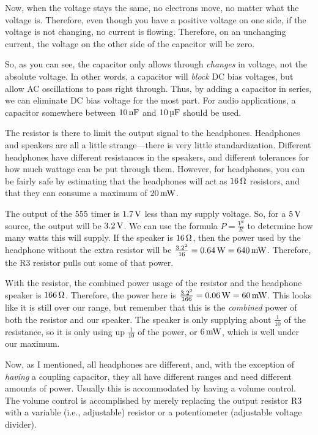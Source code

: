 Now, when the voltage stays the same, no electrons move, no matter what the voltage is.
Therefore, even though you have a positive voltage on one side, if the voltage is not changing, no current is flowing.
Therefore, on an unchanging current, the voltage on the other side of the capacitor will be zero.

So, as you can see, the capacitor only allows through \emph{changes} in voltage, not the absolute voltage.
In other words, a capacitor will \emph{block} DC bias voltages, but allow AC oscillations to pass right through.
Thus, by adding a capacitor in series, we can eliminate DC bias voltage for the most part.
For audio applications, a capacitor somewhere between $10\,\si{\nano\farad}$ and $10\,\si{\micro\farad}$ should be used.

The resistor is there to limit the output signal to the headphones.
Headphones and speakers are all a little strange---there is very little standardization.
Different headphones have different resistances in the speakers, and different tolerances for how much wattage can be put through them.
However, for headphones, you can be fairly safe by estimating that the headphones will act as $16\,\si{\ohm}$ resistors, and that they can consume a maximum of $20\,\si{\milli\watt}$.

The output of the 555 timer is $1.7\,\si{\volt}$ less than my supply voltage.
So, for a $5\,\si{\volt}$ source, the output will be $3.2\,\si{\volt}$. 
We can use the formula $P = \frac{V^2}{R}$ to determine how many watts this will supply.
If the speaker is $16\,\si{\ohm}$, then the power used by the headphone without the extra resistor will be $\frac{3.2^2}{16} = 0.64\,\si{\watt} = 640\,\si{\milli\watt}$.
Therefore, the R3 resistor pulls out some of that power.

With the resistor, the combined power usage of the resistor and the headphone speaker is $166\,\si{\ohm}$.
Therefore, the power here is $\frac{3.2^2}{166} = 0.06\,\si{\watt} = 60\,\si{\milli\watt}$.
This looks like it is still over our range, but remember that this is the \emph{combined} power of both the resistor and our speaker.
The speaker is only supplying about $\frac{1}{10}$ of the resistance, so it is only using up $\frac{1}{10}$ of the power, or $6\,\si{\milli\watt}$, which is well under our maximum.

Now, as I mentioned, all headphones are different, and, with the exception of \emph{having} a coupling capacitor, they all have different ranges and need different amounts of power.
Usually this is accommodated by having a volume control.
The volume control is accomplished by merely replacing the output resistor R3 with a variable (i.e., adjustable) resistor or a potentiometer (adjustable voltage divider).


